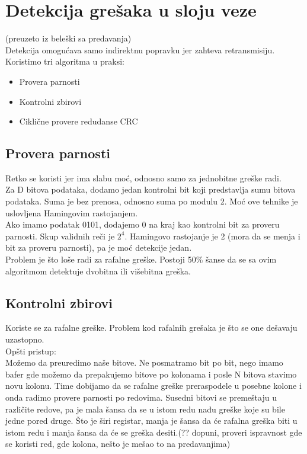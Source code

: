 \documentclass{article} %
\begin{document}
\section{Detekcija grešaka u sloju veze}
(preuzeto iz beleški sa predavanja)\\

Detekcija omogućava samo indirektnu  popravku jer zahteva retransmisiju. Koristimo tri algoritma u praksi:
\begin{itemize}
  \item Provera parnosti
  \item Kontrolni zbirovi
  \item Ciklične provere redudanse CRC
\end{itemize}
\subsection{Provera parnosti}
Retko se koristi jer ima slabu moć, odnosno samo za jednobitne greške radi.\\
Za D bitova podataka, dodamo jedan kontrolni bit koji predstavlja sumu bitova podataka. Suma je bez prenosa, odnosno suma po modulu 2. Moć ove tehnike je uslovljena Hamingovim rastojanjem. \\
Ako imamo podatak 0101, dodajemo 0 na kraj kao kontrolni bit za proveru parnosti. Skup validnih reči je $ 2^{4} $. Hamingovo rastojanje je 2 (mora da se menja i bit za proveru parnosti), pa je moć detekcije jedan. \\
 Problem je što loše radi za rafalne greške. Postoji 50\% šanse da se sa ovim algoritmom detektuje dvobitna ili višebitna greška.
 
\subsection{Kontrolni zbirovi}
Koriste se za rafalne greške. Problem kod rafalnih grešaka je što se one dešavaju uzastopno.\\
Opšti pristup:\\
Možemo da preuredimo naše bitove. Ne posmatramo bit po bit, nego imamo bafer gde možemo da prepakujemo bitove po kolonama i posle N bitova stavimo novu kolonu. Time dobijamo da se rafalne greške preraspodele u posebne kolone i onda radimo provere parnosti po redovima. Susedni bitovi se premeštaju u različite redove, pa je mala šansa da se u istom redu nađu greške koje su bile jedne pored druge. Što je širi registar, manja je šansa da će rafalna greška biti u istom redu i manja šansa da će se greška desiti.(?? dopuni, proveri ispravnost gde se koristi red, gde kolona, nešto je mešao to na predavanjima)
\end{document}
